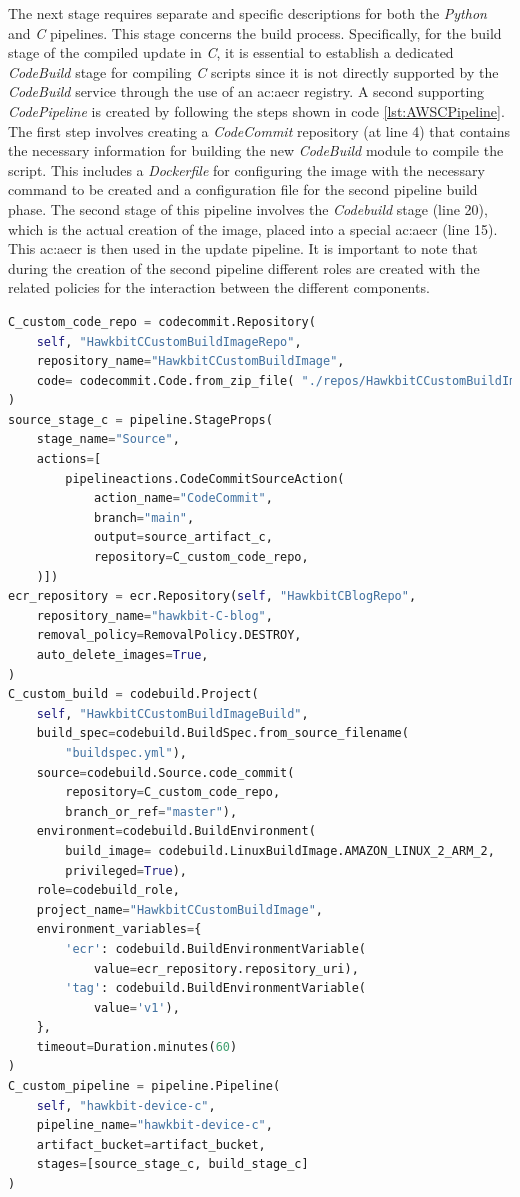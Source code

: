 The next stage requires separate and specific descriptions for both the \textit{Python} and \textit{C} pipelines. This stage concerns the build process. Specifically, for the build stage of the compiled update in \textit{C}, it is essential to establish a dedicated \textit{CodeBuild} stage for compiling \textit{C} scripts since it is not directly supported by the \textit{CodeBuild} service through the use of an \gls{ac:aecr} registry. A second supporting \textit{CodePipeline} is created by following the steps shown in code \ref{lst:AWSCPipeline}. The first step involves creating a \textit{CodeCommit} repository (at line 4) that contains the necessary information for building the new \textit{CodeBuild} module to compile the script. This includes a \textit{Dockerfile} for configuring the image with the necessary command to be created and a configuration file for the second pipeline build phase. The second stage of this pipeline involves the \textit{Codebuild} stage (line 20), which is the actual creation of the image, placed into a special \gls{ac:aecr} (line 15). This \gls{ac:aecr} is then used in the update pipeline. It is important to note that during the creation of the second pipeline different roles are created with the related policies for the interaction between the different components.
\begin{lstlisting}[language=Python, caption={\textit{CDK} code for the \textit{Codepipeline} for the \textit{C} compiled file build creation}, label=lst:AWSCPipeline]
C_custom_code_repo = codecommit.Repository(
    self, "HawkbitCCustomBuildImageRepo",
    repository_name="HawkbitCCustomBuildImage",
    code= codecommit.Code.from_zip_file( "./repos/HawkbitCCustomBuildImage.zip", "main" )
)
source_stage_c = pipeline.StageProps(
    stage_name="Source",
    actions=[
        pipelineactions.CodeCommitSourceAction(
            action_name="CodeCommit",
            branch="main",
            output=source_artifact_c,
            repository=C_custom_code_repo,
    )])
ecr_repository = ecr.Repository(self, "HawkbitCBlogRepo",
    repository_name="hawkbit-C-blog",
    removal_policy=RemovalPolicy.DESTROY,
    auto_delete_images=True,
)
C_custom_build = codebuild.Project(
    self, "HawkbitCCustomBuildImageBuild",
    build_spec=codebuild.BuildSpec.from_source_filename(
        "buildspec.yml"),
    source=codebuild.Source.code_commit(
        repository=C_custom_code_repo,
        branch_or_ref="master"),
    environment=codebuild.BuildEnvironment(
        build_image= codebuild.LinuxBuildImage.AMAZON_LINUX_2_ARM_2,
        privileged=True),
    role=codebuild_role,
    project_name="HawkbitCCustomBuildImage",
    environment_variables={
        'ecr': codebuild.BuildEnvironmentVariable(
            value=ecr_repository.repository_uri),
        'tag': codebuild.BuildEnvironmentVariable(
            value='v1'),
    },
    timeout=Duration.minutes(60)
)
C_custom_pipeline = pipeline.Pipeline(
    self, "hawkbit-device-c",
    pipeline_name="hawkbit-device-c",
    artifact_bucket=artifact_bucket,
    stages=[source_stage_c, build_stage_c]
)
\end{lstlisting}

